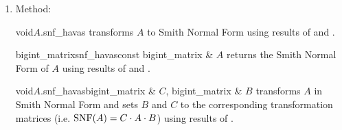 {\begin{enumerate}
  \begin{fcode}{bigint_matrix}{snf_hartley}{const bigint_matrix & $A$}
    returns the Smith Normal Form of $A$ using a variant of the algorithm of Hartley and Hawkes.
  \end{fcode}

  \begin{fcode}{void}{$A$.snf_hartley}{bigint_matrix & $C$, bigint_matrix & $B$}
    transforms $A$ in Smith Normal Form and sets $B$ and $C$ to the corresponding transformation
    matrices (i.e. $\SNF(A) = C \cdot A\cdot B$) using a variant of the algorithm of Hartley and
    Hawkes.
  \end{fcode}

  \begin{fcode}{bigint_matrix}{snf_hartley}{const bigint_matrix & $A$, bigint_matrix & $C$, bigint_matrix & $B$}
    returns the Smith Normal Form of $A$ and sets $B$ and $C$ to the corresponding
    transformation matrices (i.e. $\SNF(A) = C \cdot A\cdot B$) using a variant of the algorithm
    of Hartley and Hawkes.
  \end{fcode}

\item Method:

  \begin{fcode}{void}{$A$.snf_havas}{}
    transforms $A$ to Smith Normal Form using results of \cite{Havas/Holt/Rees:1993}
    \cite{Havas/Majewski:1997} and \cite{Havas/Sterling:1979}.
  \end{fcode}

  \begin{fcode}{bigint_matrix}{snf_havas}{const bigint_matrix & $A$}
    returns the Smith Normal Form of $A$ using results of \cite{Havas/Holt/Rees:1993}
    \cite{Havas/Majewski:1997} and \cite{Havas/Sterling:1979}.
  \end{fcode}

  \begin{fcode}{void}{$A$.snf_havas}{bigint_matrix & $C$, bigint_matrix & $B$}
    transforms $A$ in Smith Normal Form and sets $B$ and $C$ to the corresponding transformation
    matrices (i.e. $\SNF(A) = C \cdot A \cdot B$) using results of \cite{Havas/Holt/Rees:1993}
    \cite{Havas/Majewski:1997} \cite{Havas/Sterling:1979}.
  \end{fcode}


\end{enumerate}}
